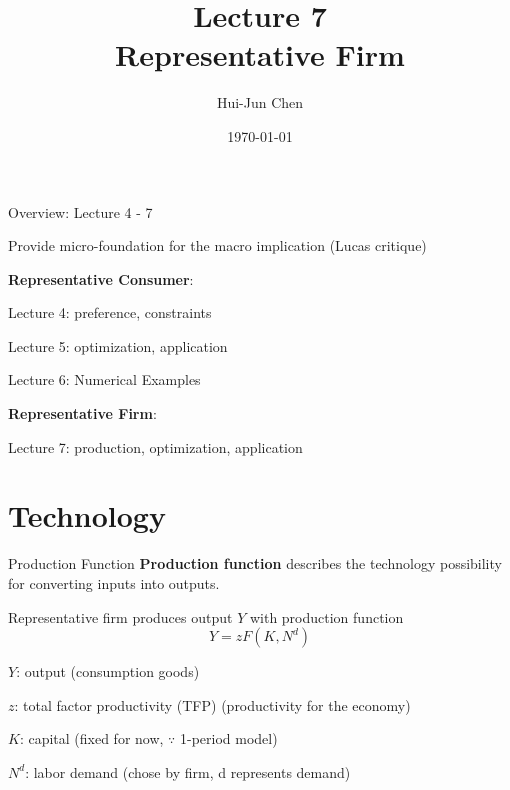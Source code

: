 \documentclass[11pt,aspectratio=169,usenames,dvipsnames]{beamer}
\title[Lecture 7]{Lecture 7 \\ Representative Firm}
\author[Hui-Jun Chen]{Hui-Jun Chen}
\institute[NTHU]{National Tsing Hua University}
\date{\today}
\let\tempone\itemize
\let\temptwo\enditemize
\renewenvironment{itemize}{\tempone\addtolength{\itemsep}{\fill}}{\temptwo}
\begin{document}
\begin{frame}[plain]
    \titlepage
\end{frame}

\begin{frame}{Overview: Lecture 4 - 7}
\label{slide:Overview__Lecture_4_7}

\begin{center}
Provide \alert{micro-foundation} for the \alert{macro implication} (\alert{Lucas critique})
\end{center}

\begin{itemize}
    \item \textbf{Representative Consumer}:
    \begin{itemize}
        \item Lecture 4: \alert{preference}, \alert{constraints}
        \item Lecture 5: \alert{optimization}, \alert{application}
        \item Lecture 6: Numerical Examples
    \end{itemize}
    \item \textbf{Representative Firm}:
    \begin{itemize}
        \item Lecture 7: \alert{production}, \alert{optimization}, \alert{application}
    \end{itemize}
\end{itemize}
\end{frame}

\section{Technology}
\label{sec:Technology}

\begin{frame}{Production Function}
\label{slide:Production_Function}
    \textbf{Production function} describes the technology possibility for \alert{converting inputs into outputs}.

    Representative firm produces output $ Y $ with production function
    \begin{equation}
    \label{eq:production}
         Y = z F( K, N^{d} )
    \end{equation}
    \begin{itemize}
        \item $ Y $: output (consumption goods)
        \item $ z $: \alert{total factor productivity (TFP)} (productivity for the economy)
        \item $ K $: capital (fixed for now, $ \because $ 1-period model)
        \item $ N^{d} $: labor demand (chose by firm, \alert{d} represents demand)
    \end{itemize}
\end{frame}
\end{document}
